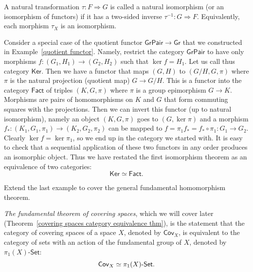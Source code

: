%
\begin{defn}
    A natural transformation $\tau:F\Longrightarrow G$ is called a natural isomorphism (or an isomorphism of functors) if it has a two-sided inverse $\tau^{-1}:G\Longrightarrow F$. Equivalently, each morphism $\tau_X$ is an isomorphism.
\end{defn}
%
\begin{example}
    Consider a special case of the quotient functor $\mathsf{GrPair}\to\mathsf{Gr}$
    that we constructed in Example~\ref{quotient functor}. Namely, restrict
    the category $\mathsf{GrPair}$ to have only morphisms $f:\left(G_{1},H_{1}\right)\to\left(G_{2},H_{2}\right)$
    such that $\ker f=H_{1}$. Let us call thus category $\mathsf{Ker}$.
    Then we have a functor that maps $\left(G,H\right)$ to $\left(G/H,G,\pi\right)$
    where $\pi$ is the natural projection (quotient map) $G\to G/H$.
    This is a functor into the category $\mathsf{Fact}$ of triples $\left(K,G,\pi\right)$
    where $\pi$ is a group epimorphism $G\to K$. Morphisms are pairs
    of homomorphisms on $K$ and $G$ that form commuting squares with
    the projections. Then we can invert this functor (up to natural isomorphism),
    namely an object $\left(K,G,\pi\right)$ goes to $\left(G,\ker\pi\right)$
    and a morphism $f_{\ast}:\left(K_{1},G_{1},\pi_{1}\right)\to\left(K_{2},G_{2},\pi_{2}\right)$
    can be mapped to $f=\pi_{1}f_{\ast}=f_{\ast}\circ\pi_{1}:G_{1}\to G_{2}$.
    Clearly $\ker f=\ker\pi_{1}$, so we end up in the category we started
    with. It is easy to check that a sequential application of these two
    functors in any order produces an isomorphic object. Thus we have
    restated the first isomorphism theorem as an equivalence of two categories:
    \[
    \mathsf{Ker}\simeq\mathsf{Fact}.
    \]
\end{example}
\begin{xca}
    Extend the last example to cover the general fundamental homomorphism
    theorem.
\end{xca}
\begin{example}\label{covering category thm}
    \emph{The fundamental theorem of covering spaces},
    which we will cover later (Theorem~\ref{covering spaces category equivalence thm}), is the statement that the category of covering
    spaces of a space $X$, denoted by $\mathsf{Cov}_{X}$, is equivalent
    to the category of sets with an action of the fundamental group of
    $X$, denoted by $\pi_{1}\left(X\right)\text{-}\mathsf{Set}$:
    \[
    \mathsf{Cov}_{X}\simeq \pi_{1}(X){\text -}\mathsf{Set}.
    \]
\end{example}
